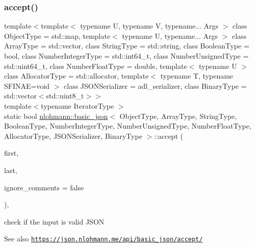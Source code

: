 \subsubsection{\texorpdfstring{accept()}{accept()}\hspace{0.1cm}{\footnotesize\ttfamily [2/2]}}
{\footnotesize\ttfamily template$<$template$<$ typename U, typename V, typename... Args $>$ class Object\+Type = std\+::map, template$<$ typename U, typename... Args $>$ class Array\+Type = std\+::vector, class String\+Type  = std\+::string, class Boolean\+Type  = bool, class Number\+Integer\+Type  = std\+::int64\+\_\+t, class Number\+Unsigned\+Type  = std\+::uint64\+\_\+t, class Number\+Float\+Type  = double, template$<$ typename U $>$ class Allocator\+Type = std\+::allocator, template$<$ typename T, typename S\+F\+I\+N\+A\+E=void $>$ class J\+S\+O\+N\+Serializer = adl\+\_\+serializer, class Binary\+Type  = std\+::vector$<$std\+::uint8\+\_\+t$>$$>$ \\
template$<$typename Iterator\+Type $>$ \\
static bool \hyperlink{classnlohmann_1_1basic__json}{nlohmann\+::basic\+\_\+json}$<$ Object\+Type, Array\+Type, String\+Type, Boolean\+Type, Number\+Integer\+Type, Number\+Unsigned\+Type, Number\+Float\+Type, Allocator\+Type, J\+S\+O\+N\+Serializer, Binary\+Type $>$\+::accept (\begin{DoxyParamCaption}\item[{Iterator\+Type}]{first,  }\item[{Iterator\+Type}]{last,  }\item[{const bool}]{ignore\+\_\+comments = {\ttfamily false} }\end{DoxyParamCaption})\hspace{0.3cm}{\ttfamily [inline]}, {\ttfamily [static]}}



check if the input is valid J\+S\+ON 

\begin{DoxySeeAlso}{See also}
\href{https://json.nlohmann.me/api/basic_json/accept/}{\tt https\+://json.\+nlohmann.\+me/api/basic\+\_\+json/accept/} 
\end{DoxySeeAlso}
\mbox{\label{classnlohmann_1_1basic__json_a2c8d8f5741aedadac8f3bffd8f2ce13e}} 
